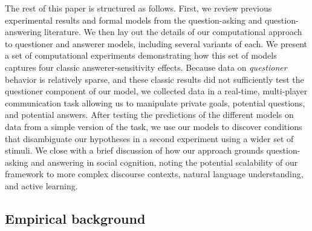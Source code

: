 \documentclass[12pt, floatsintext, jou]{apa6}
\begin{document}
%

The rest of this paper is structured as follows. First, we review previous experimental results and formal models from the question-asking and question-answering literature. We then lay out the details of our computational approach  to questioner and answerer models, including several variants of each. We present a set of computational experiments demonstrating how this set of models captures four classic answerer-sensitivity effects.
Because data on \emph{questioner} behavior is relatively sparse, and these classic results did not sufficiently test the questioner component of our model, we collected data in a real-time, multi-player communication task allowing us to manipulate private goals, potential questions, and potential answers. After testing the predictions of the different models on data from a simple version of the task, we use our models to discover conditions that disambiguate our hypotheses in a second experiment using a wider set of stimuli.
We close with a brief discussion of how our approach grounds question-asking and answering in social cognition, noting the potential scalability of our framework to more complex discourse contexts, natural language understanding, and active learning.


\subsection{Empirical background}
\end{document}
